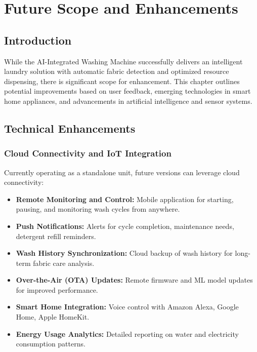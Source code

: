 \chapter{Future Scope and Enhancements}

\section{Introduction}
While the AI-Integrated Washing Machine successfully delivers an intelligent laundry solution with automatic fabric detection and optimized resource dispensing, there is significant scope for enhancement. This chapter outlines potential improvements based on user feedback, emerging technologies in smart home appliances, and advancements in artificial intelligence and sensor systems.

\section{Technical Enhancements}

\subsection{Cloud Connectivity and IoT Integration}
Currently operating as a standalone unit, future versions can leverage cloud connectivity:
\begin{itemize}
    \item \textbf{Remote Monitoring and Control:} Mobile application for starting, pausing, and monitoring wash cycles from anywhere.
    \item \textbf{Push Notifications:} Alerts for cycle completion, maintenance needs, detergent refill reminders.
    \item \textbf{Wash History Synchronization:} Cloud backup of wash history for long-term fabric care analysis.
    \item \textbf{Over-the-Air (OTA) Updates:} Remote firmware and ML model updates for improved performance.
    \item \textbf{Smart Home Integration:} Voice control with Amazon Alexa, Google Home, Apple HomeKit.
    \item \textbf{Energy Usage Analytics:} Detailed reporting on water and electricity consumption patterns.
\end{itemize}

